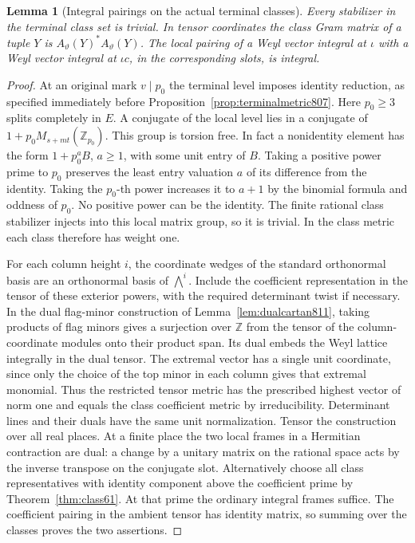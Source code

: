 \documentclass[a4paper,11pt]{article}
\newtheorem{lemma}[proposition]{Lemma}
\theoremstyle{definition}
\theoremstyle{remark}
\numberwithin{equation}{section}
\begin{document}
\begin{lemma}[Integral pairings on the actual terminal classes]
\leavevmode\label{lem:terminalintegral867}
Every stabilizer in the terminal class set is trivial. In tensor
coordinates the class Gram matrix of a tuple \(Y\) is
\(A_\vartheta(Y)^*A_\vartheta(Y)\). The local pairing of a Weyl
vector integral at \(\iota\) with a Weyl vector integral at
\(\iota c\), in the corresponding slots, is integral.
\end{lemma}
\begin{proof}
At an original mark \(v\mid p_0\) the terminal level imposes
identity reduction, as specified immediately before
Proposition~\ref{prop:terminalmetric807}. Here \(p_0\ge3\)
splits completely in \(E\). A conjugate of the local level
lies in a conjugate of \(1+p_0 M_{s+mt}(\mathbb Z_{p_0})\).
This group is torsion free. In fact a nonidentity element
has the form \(1+p_0^aB\), \(a\ge1\), with some unit entry
of \(B\). Taking a positive power prime to \(p_0\) preserves
the least entry valuation \(a\) of its difference from the
identity. Taking the \(p_0\)-th power increases it to \(a+1\)
by the binomial formula and oddness of \(p_0\). No positive
power can be the identity. The finite rational class stabilizer
injects into this local matrix group, so it is trivial.
In the class metric each class therefore has weight one.

For each column height \(i\), the coordinate wedges of the
standard orthonormal basis are an orthonormal basis of
\(\bigwedge^i\). Include the coefficient representation in
the tensor of these exterior powers, with the required
determinant twist if necessary. In the dual flag-minor
construction of Lemma~\ref{lem:dualcartan811}, taking products
of flag minors gives a surjection over \(\mathbb Z\) from the
tensor of the column-coordinate modules onto their product
span. Its dual embeds the Weyl lattice integrally in the
dual tensor. The extremal vector has a single unit coordinate,
since only the choice of the top minor in each column gives
that extremal monomial. Thus the restricted tensor metric
has the prescribed highest vector of norm one and equals the
class coefficient metric by irreducibility. Determinant lines
and their duals have the same unit normalization. Tensor the
construction over all real places. At a finite place the two
local frames in a Hermitian contraction are dual: a change
by a unitary matrix on the rational space acts by the inverse
transpose on the conjugate slot. Alternatively choose all
class representatives with identity component above the
coefficient prime by Theorem~\ref{thm:class61}. At that prime
the ordinary integral frames suffice. The coefficient pairing
in the ambient tensor has identity matrix, so summing over the
classes proves the two assertions.
\end{proof}
\end{document}
